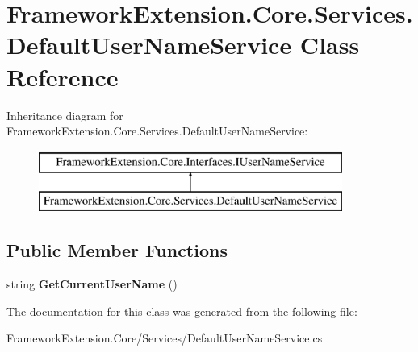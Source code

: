 \hypertarget{class_framework_extension_1_1_core_1_1_services_1_1_default_user_name_service}{\section{Framework\-Extension.\-Core.\-Services.\-Default\-User\-Name\-Service Class Reference}
\label{class_framework_extension_1_1_core_1_1_services_1_1_default_user_name_service}
}
Inheritance diagram for Framework\-Extension.\-Core.\-Services.\-Default\-User\-Name\-Service\-:\begin{figure}[H]
\begin{center}
\leavevmode
\includegraphics[height=2.000000cm]{class_framework_extension_1_1_core_1_1_services_1_1_default_user_name_service}
\end{center}
\end{figure}
\subsection*{Public Member Functions}
\begin{DoxyCompactItemize}
\item 
\hypertarget{class_framework_extension_1_1_core_1_1_services_1_1_default_user_name_service_aaa3a0df3d14c34e0ac74f341f817fe0a}{string {\bfseries Get\-Current\-User\-Name} ()}\label{class_framework_extension_1_1_core_1_1_services_1_1_default_user_name_service_aaa3a0df3d14c34e0ac74f341f817fe0a}

\end{DoxyCompactItemize}


The documentation for this class was generated from the following file\-:\begin{DoxyCompactItemize}
\item 
Framework\-Extension.\-Core/\-Services/Default\-User\-Name\-Service.\-cs\end{DoxyCompactItemize}
